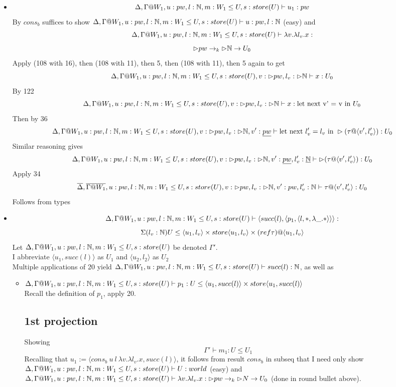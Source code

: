 \documentclass{article}
\begin{document}
\begin{itemize}
    \item \[\Delta, \Gamma@W_1, u: pw, l: \N, m: W_1 \leq U, s: store(U) \vdash  u_1: pw\]
    By $cons_b$ suffices to show $\Delta, \Gamma@W_1, u: pw, l: \N, m: W_1 \leq U, s: store(U) \vdash u : pw, l : \N$ (easy) and
    \[\Delta, \Gamma@W_1, u: pw, l: \N, m: W_1 \leq U, s: store(U) \vdash \lambda v. \lambda l_v. x:\]  
    \[\rhd pw \rightarrow_k \rhd \mathbb{N} \rightarrow U_0 
    \]
    Apply (108 with 16), then (108 with 11), then 5, then (108 with 11), then 5 again to get
     \[\Delta, \Gamma@W_1, u: pw, l: \N, m: W_1 \leq U, s: store(U), v: \rhd pw, l_v: \rhd \N \vdash x: U_0\]
     By 122
      \[\Delta, \Gamma@W_1, u: pw, l: \N, m: W_1 \leq U, s: store(U), v: \rhd pw, l_v: \rhd \N \vdash x: \text{let next v' = v in $U_0$}\]
      Then by 36 
 \[\Delta, \Gamma@W_1, u: pw, l: \N, m: W_1 \leq U, s: store(U), v: \rhd pw, l_v: \rhd \N, v': \underline{pw} \vdash \text{let next } l_v' = l_v \text{ in } \rhd(\tau @ \langle v', l_v' \rangle): U_0\]
 Similar reasoning gives 
 \[\Delta, \Gamma@W_1, u: pw, l: \N, m: W_1 \leq U, s: store(U), v: \rhd pw, l_v: \rhd \N, v': \underline{pw}, l_v' : \underline{\N} \vdash  \rhd(\tau @ \langle v', l_v' \rangle): U_0\]
   Apply 34
    \[\overline{\Delta}, \overline{\Gamma@W_1}, u: pw, l: \N, m: W_1 \leq U, s: store(U), v: \rhd pw, l_v: \rhd \N, v': pw, l_v' : \N \vdash \tau @ \langle v',  l_v' \rangle: U_0\]
    Follows from types 
    \item \[\Delta, \Gamma@W_1, u: pw, l: \N, m: W_1 \leq U, s: store(U) \vdash  \langle succ(l), \langle p_1, \langle l, *, \lambda \_. *
\rangle \rangle \rangle :\] \[\Sigma(l_v: \mathbb{N}) U \leq \langle u_1, l_v \rangle \times store\langle u_1, l_v \rangle \times (ref \tau)@\langle u_1, l_v \rangle\]
 Let $\Delta, \Gamma@W_1, u: pw, l: \N, m: W_1 \leq U, s: store(U)$ be denoted $\Gamma'$.\\
 I abbreviate $\langle u_1, succ(l) \rangle$ as $U_1$ and $\langle u_2, l_2 \rangle$ as $U_2$\\
Multiple applications of 20 yield $\Delta, \Gamma@W_1, u: pw, l: \N, m: W_1 \leq U, s: store(U) \vdash succ(l) : \N$, as well as
\begin{itemize}
    \item $\Delta, \Gamma@W_1, u: pw, l: \N, m: W_1 \leq U, s: store(U) \vdash p_1 : U \leq \langle u_1, succ(l) \rangle \times store\langle u_1, succ(l) \rangle$\\
    
    Recall the definition of $p_1$, apply 20. 
    \subsection*{1st projection}
    Showing \[\Gamma' \vdash m_1 : U \leq U_1\]
    Recalling that $u_1 := \langle cons_b \: u\:  l\: \lambda v. \lambda l_v. x , succ(l) \rangle$, it follows from result $cons_b$ in subseq that I need only show $\Delta, \Gamma@W_1, u: pw, l: \N, m: W_1 \leq U, s: store(U) \vdash U : world$ (easy) and $\Delta, \Gamma@W_1, u: pw, l: \N, m: W_1 \leq U, s: store(U) \vdash \lambda v. \lambda l_v. x : \rhd pw \imp_k \rhd N \imp U_0$ (done in round bullet above).

\end{itemize}
\end{itemize}
\end{document}
